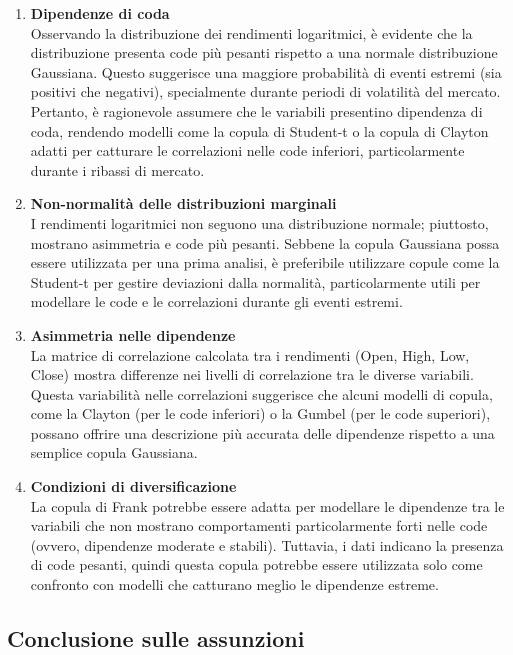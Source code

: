 \documentclass[%
	corpo=11pt,
    twoside,
    stile=classica,
    oldstyle,
    tipotesi=custom,
    greek,
    evenboxes,
]{toptesi}
\begin{document}
\begin{enumerate}
	\item \textbf{Dipendenze di coda} \\
	Osservando la distribuzione dei rendimenti logaritmici, è evidente che la distribuzione presenta code più pesanti rispetto a una normale distribuzione Gaussiana. Questo suggerisce una maggiore probabilità di eventi estremi (sia positivi che negativi), specialmente durante periodi di volatilità del mercato. Pertanto, è ragionevole assumere che le variabili presentino dipendenza di coda, rendendo modelli come la copula di Student-t o la copula di Clayton adatti per catturare le correlazioni nelle code inferiori, particolarmente durante i ribassi di mercato.
	
	\item \textbf{Non-normalità delle distribuzioni marginali} \\
	I rendimenti logaritmici non seguono una distribuzione normale; piuttosto, mostrano asimmetria e code più pesanti. Sebbene la copula Gaussiana possa essere utilizzata per una prima analisi, è preferibile utilizzare copule come la Student-t per gestire deviazioni dalla normalità, particolarmente utili per modellare le code e le correlazioni durante gli eventi estremi.
	
	\item \textbf{Asimmetria nelle dipendenze} \\
	La matrice di correlazione calcolata tra i rendimenti (Open, High, Low, Close) mostra differenze nei livelli di correlazione tra le diverse variabili. Questa variabilità nelle correlazioni suggerisce che alcuni modelli di copula, come la Clayton (per le code inferiori) o la Gumbel (per le code superiori), possano offrire una descrizione più accurata delle dipendenze rispetto a una semplice copula Gaussiana.
	
	\item \textbf{Condizioni di diversificazione} \\
	La copula di Frank potrebbe essere adatta per modellare le dipendenze tra le variabili che non mostrano comportamenti particolarmente forti nelle code (ovvero, dipendenze moderate e stabili). Tuttavia, i dati indicano la presenza di code pesanti, quindi questa copula potrebbe essere utilizzata solo come confronto con modelli che catturano meglio le dipendenze estreme.
\end{enumerate}

\subsection{Conclusione sulle assunzioni}
\end{document}
